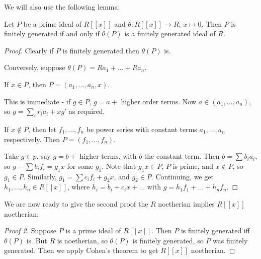 \documentclass[10pt,a4paper]{article}
\begin{document}
We will also use the following lemma:
\begin{lemma}
  Let $P$ be a prime ideal of $R[[x]]$ and $\theta : R[[x]] \to R$, $x \mapsto 0$. Then $P$ is finitely generated if and only if $\theta(P)$ is a finitely generated ideal of $R$.
\end{lemma}
\begin{proof}
  Clearly if $P$ is finitely generated then $\theta(P)$ is.

  Conversely, suppose $\theta(P) = Ra_1 + \ldots + Ra_n$.

  If $x \in P$, then $P = (a_1, \ldots, a_n, x)$.

  This is immediate - if $g \in P$, $g = a + $ higher order terms. Now $a \in (a_1, \ldots, a_n)$, so $g = \sum_i r_i a_i + xg'$ as required.

  If $x \nin P$, then let $f_1, \ldots, f_n$ be power series with constant terms $a_1, \ldots, a_n$ respectively. Then $P = (f_1, \ldots, f_n)$.

  Take $g \in p$, say $g = b +$ higher terms, with $b$ the constant term. Then $b = \sum b_i a_i$, so $g - \sum b_i f_i = g_1 x$ for some $g_1$. Note that $g_1 x \in P$, $P$ is prime, and $x \nin P$, so $g_1 \in P$. Similarly, $g_1 = \sum c_i f_i + g_2 x$, and $g_2 \in P$. Continuing, we get $h_1, \ldots, h_n \in R[[x]]$, where $h_i = b_i + c_i x + \ldots$ with $g = h_1f_1 + \ldots + h_nf_n$.
\end{proof}

We are now ready to give the second proof the $R$ noetherian implies $R[[x]]$ noetherian:
\begin{proof}[Proof 2]
  Suppose $P$ is a prime ideal of $R[[x]]$. Then $P$ is finitely generated iff $\theta(P)$ is. But $R$ is noetherian, so $\theta(P)$ is finitely generated, so $P$ was finitely generated. Then we apply Cohen's theorem to get $R[[x]]$ noetherian.
\end{proof}
\end{document}
